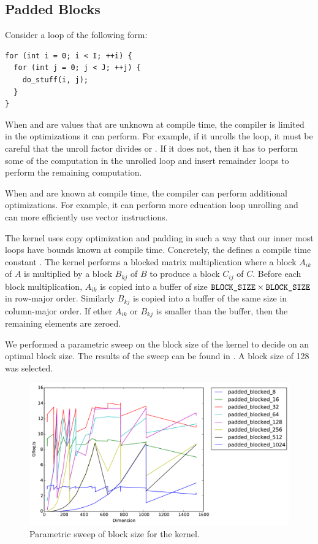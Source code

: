 \subsection{Padded Blocks}
Consider a loop of the following form:
\begin{verbatim}
for (int i = 0; i < I; ++i) {
  for (int j = 0; j < J; ++j) {
    do_stuff(i, j);
  }
}
\end{verbatim}
When  and  are values that are unknown at compile time, the
compiler is limited in the optimizations it can perform. For example, if it
unrolls the loop, it must be careful that the unroll factor divides  or
. If it does not, then it has to perform some of the computation in the
unrolled loop and insert remainder loops to perform the remaining computation.

When  and  are known at compile time, the compiler can perform
additional optimizations. For example, it can perform more education loop
unrolling and can more efficiently use vector instructions.

The  kernel uses copy optimization and padding in such a
way that our inner most loops have bounds known at compile time. Concretely,
the  defines a compile time constant .
The kernel performs a blocked matrix multiplication where a block $A_{ik}$ of
$A$ is multiplied by a block $B_{kj}$ of $B$ to produce a block $C_{ij}$ of
$C$. Before each block multiplication, $A_{ik}$ is copied into a buffer of size
$\texttt{BLOCK\_SIZE} \times \texttt{BLOCK\_SIZE}$ in row-major order. Similarly
$B_{kj}$ is copied into a buffer of the same size in column-major order. If
ether $A_{ik}$ or $B_{kj}$ is smaller than the buffer, then the remaining
elements are zeroed.

We performed a parametric sweep on the block size of the 
kernel to decide on an optimal block size. The results of the sweep can be
found in . A block size of 128 was selected.

\begin{figure}[h]
  \centering
  \includegraphics[width=\textwidth]{img/timing_padded_sweep.pdf}
  \caption{Parametric sweep of block size for the  kernel.}
  \label{fig:padded-sweep}
\end{figure}
